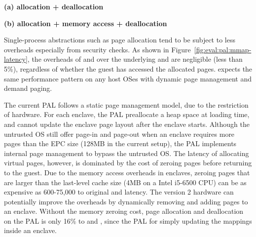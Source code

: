 \label{sec:eval:pal:memory}

\begin{figure*}[t!]
\centering
\footnotesize
{}
\parbox{0.49\textwidth}{\centering\bf (a) allocation + deallocation}
\parbox{0.49\textwidth}{\centering\bf (b) allocation + memory access + deallocation}
\caption{Latency of (a) allocating and deallocating a range of virtual pages, and (b) the same operations with writing to each page after allocation. Lower is better.
The comparison is between (1)  and  on Linux; (2)  and  on the Linux PAL, with and without a \seccomp{} filter ({\bf +SC}) and reference monitor ({\bf +RM}); (3) the same \hostapis{} on the \sgx{} PAL, with and without zeroing the pages before use ({\bf +Zero}).}
\label{fig:eval:pal:mmap-latency}
\end{figure*}

Single-process abstractions such as page allocation
tend to be
subject to less overheads
especially from security checks.
As shown in Figure~\ref{fig:eval:pal:mmap-latency},
the overheads of  and 
over the underlying  and 
are negligible (less than 5\%),
regardless of whether
the guest has accessed the allocated pages.
\graphene{} expects the same performance pattern on any host OSes with dynamic page management
and demand paging.



The current \sgx{} PAL follows a static page management model,
due to the restriction of \sgx{} hardware.
For each enclave,
the \sgx{} PAL preallocate a heap space
at loading time,
and cannot update the enclave page layout
after the enclave starts. 
Although the untrusted OS still offer page-in and page-out
when an enclave requires more pages
than the EPC size (128MB in the current setup),
the \sgx{} PAL implements
internal page management to bypass the untrusted OS.
The latency
of allocating virtual pages, however,
is dominated by the cost of zeroing pages before returning to the guest.
Due to the memory access overheads in enclaves,
zeroing pages that are larger than the last-level cache size (4MB on a Intel i5-6500 CPU)
can be as expensive as 600-75,000\x{} to original  and  latency.
The \sgx{} version 2 hardware
can potentially improve the overheads by dynamically removing and adding pages to an enclave.
Without the memory zeroing cost,
page allocation and deallocation on the \sgx{} PAL
is only \roughly{}16\% to  and ,
since the \sgx{} PAL
for simply updating the mappings
inside an enclave.

